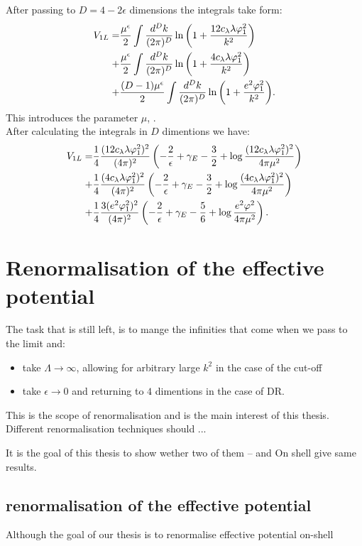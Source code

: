 After passing to $D=4-2\epsilon$ dimensions the integrals take form: 
\begin{align}
V_{1L}=&\frac{\mu^\epsilon}{2} \int\frac{d^Dk}{(2\pi)^D}\ln{\left(1+\frac{12c_\lambda\lambda\varphi_1^2}{k^2}
\right)}\\
+&\frac{\mu^\epsilon}{2} \int\frac{d^Dk}{(2\pi)^D}\ln{\left(1+\frac{4c_\lambda\lambda\varphi_1^2}{k^2}
\right)} \\ 
+&\frac{(D-1)\mu^\epsilon}{2} \int\frac{d^Dk}{(2\pi)^D}\ln{\left(1+\frac{e^2\varphi_1^2}{k^2}\right)}.
\end{align}
This introduces the parameter $\mu$, . \\

After calculating the integrals in $D$ dimentions we have:
\begin{align}
V_{1L}=&\frac{1}{4}\frac{(12c_\lambda\lambda\varphi_1^2)^2}{(4\pi)^2}\left(-\frac{2}{\epsilon}
+\gamma_E-\frac{3}{2}+\log{\frac{(12c_\lambda\lambda\varphi_1^2)^2}{4\pi\mu^2}}\right)  \\
+&\frac{1}{4}\frac{(4c_\lambda\lambda\varphi_1^2)^2}{(4\pi)^2}\left(-\frac{2}{\epsilon}
+\gamma_E-\frac{3}{2}+\log{\frac{(4c_\lambda\lambda\varphi_1^2)^2}{4\pi\mu^2}}\right)  \\
+&\frac{1}{4}\frac{3(e^2\varphi_1^2)^2}{(4\pi)^2}\left(-\frac{2}{\epsilon}+\gamma_E
-\frac{5}{6}+\log{\frac{e^2\varphi^2}{4\pi\mu^2}}\right).
\end{align}
\section{Renormalisation of the effective potential}
The task that is still left, is to mange the infinities that come when we pass to the limit 
and:
\begin{itemize} 
\item take $\Lambda \to \infty$, allowing for arbitrary large $k^2$ in the case of the cut-off
\item take $\epsilon \to 0$ and returning to $4$ dimentions in the case of DR.

\end{itemize}
This is the scope of renormalisation and is the main interest of this thesis. 
Different renormalisation techniques should ... 

It is the goal of this thesis to show wether two of them -- \MSbar and On shell give same results.


\subsection{\texorpdfstring{\MSbar}{MS-bar} renormalisation of the effective potential}
Although the goal of our thesis is to renormalise effective potential on-shell

